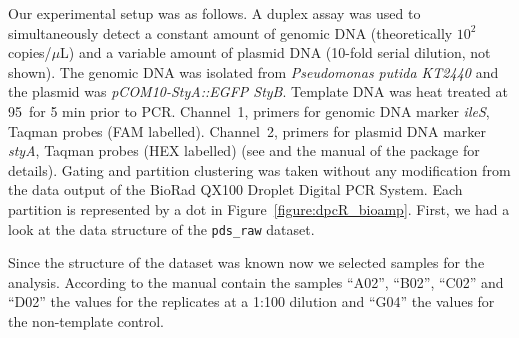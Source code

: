 Our experimental setup was as follows. A duplex assay was used to simultaneously 
detect a constant amount of genomic DNA (theoretically $10^{2}$ copies/$\mu$L) 
and a variable amount of plasmid DNA (10-fold serial dilution, not shown). The 
genomic DNA was isolated from \textit{Pseudomonas putida KT2440} and the plasmid 
was \textit{pCOM10-StyA::EGFP StyB}. Template DNA was heat treated at 
95\textcelsius~for 5 min prior to PCR. Channel~1, primers for genomic DNA marker 
\textit{ileS}, Taqman probes (FAM labelled). Channel~2, primers for plasmid DNA 
marker \textit{styA}, Taqman probes (HEX labelled) (see \citep{jahn_2013, 
jahn_2014} and the manual of the  package for details). Gating and 
partition clustering was taken without any modification from the data output of 
the BioRad QX100 Droplet  Digital PCR System. Each partition is represented by a 
dot in Figure~\ref{figure:dpcR_bioamp}. First, we had a look at the data 
structure of the \texttt{pds\_raw} dataset.


Since the structure of the dataset was known now we selected samples for the 
analysis. According to the  manual contain the samples ``A02'', 
``B02'', ``C02'' and ``D02'' the values for the replicates at a 1:100 dilution 
and ``G04'' the values for the non-template control.

